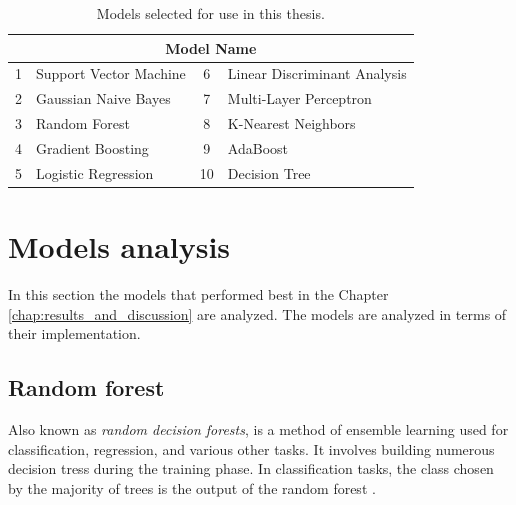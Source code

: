         \begin{table}[htbp]
            \centering
            \begin{tabular}{@{}clcl@{}}
                \toprule
                \multicolumn{4}{c}{\textbf{Model Name}} \\
                \midrule
                1 & Support Vector Machine & 6 & Linear Discriminant Analysis \\
                2 & Gaussian Naive Bayes & 7 & Multi-Layer Perceptron \\
                3 & Random Forest & 8 & K-Nearest Neighbors \\
                4 & Gradient Boosting & 9 & AdaBoost \\
                5 & Logistic Regression & 10 & Decision Tree \\
                \bottomrule
            \end{tabular}
            \caption{Models selected for use in this thesis.}
            \label{tab:movements_table}
        \end{table}
    
    \section{Models analysis}
        
        In this section the models that performed best in the Chapter \ref{chap:results_and_discussion} are analyzed. The models are analyzed in terms of their implementation.

        \subsection{Random forest}
           Also known as \textit{random decision forests}, is a method of ensemble learning used for classification, regression, and various other tasks. It involves building numerous decision tress during the training phase. In classification tasks, the class chosen by the majority of trees is the output of the random forest \cite{ho_random_1998}.

